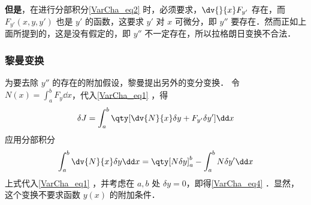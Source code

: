 \textbf{但是}，在进行分部积分\autoref{VarCha_eq2} 时，必须要求，$\dv{}{x}F_{y'}$ 存在，而 $F_{y'}(x,y,y')$ 也是 $y'$ 的函数，这要求 $y'$ 对 $x$ 可微分，即 $y''$ 要存在．然而正如上面所提到的，这是没有假定的，即 $y''$ 不一定存在，所以拉格朗日变换不合法．
\subsubsection{黎曼变换}
为要去除 $y''$ 的存在的附加假设，黎曼提出另外的变分变换．
令 $N(x)=\int_a^bF_y\dd x$，代入\autoref{VarCha_eq1} ，得
\begin{equation}
\delta J=\int_a^b\qty[\dv{N}{x}\delta y+F_{y'}\delta y']\dd x
\end{equation}
应用分部积分
\begin{equation}
\int_a^b\dv{N}{x}\delta y\dd x=\qty[N\delta y]_a^b-\int_a^bN\delta y'\dd x
\end{equation}
上式代入\autoref{VarCha_eq1} ，并考虑在 $a,b$ 处 $\delta y=0$，即得\autoref{VarCha_eq4} ．显然，这个变换不要求函数 $y(x)$ 的附加条件．
